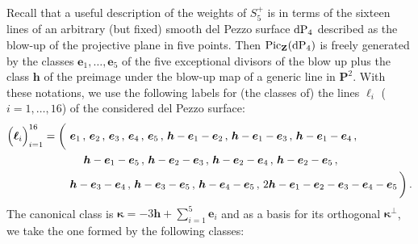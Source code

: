 \documentclass[11pt]{amsart}
\begin{document}
  Recall that a useful description of the weights of $S_5^+$ is in terms of the sixteen lines of an arbitrary (but fixed) smooth del Pezzo surface ${\rm dP}_4$ described as the blow-up of the projective plane in five points.  Then ${\rm Pic}_{\mathbf Z}({\rm dP}_4)$ is freely generated by the classes 
  $\boldsymbol{e}_{1},\ldots,\boldsymbol{e}_{5}$  of the five exceptional divisors of the blow up plus the class $\boldsymbol{h}$ of the preimage under the blow-up map of a generic line in $\mathbf P^2$.  With these notations,  we use the following labels for (the classes  of) the lines $ \boldsymbol{\ell}_i$ ($i=1,\ldots,16$) of the considered del Pezzo surface: 
\begin{align*}%
\Big( \boldsymbol{\ell}_i \Big)_{i=1}^{16}=\bigg(\, & \, \boldsymbol{e}_{1} \, , \, \boldsymbol{e}_{2}\, , \, \boldsymbol{e}_{3}\, , \,\boldsymbol{e}_{4}\, , \, \boldsymbol{e}_{5}\, , \, \boldsymbol{h} -\boldsymbol{e}_{1}-\boldsymbol{e}_{2}\, , \, \boldsymbol{h} -\boldsymbol{e}_{1}-\boldsymbol{e}_{3}\, ,\,  
\boldsymbol{h} -\boldsymbol{e}_{1}-\boldsymbol{e}_{4}\, , 
\\
&  \hspace{0.5cm} \boldsymbol{h} -\boldsymbol{e}_{1}-\boldsymbol{e}_{5}\, , \, \boldsymbol{h} -\boldsymbol{e}_{2}-\boldsymbol{e}_{3}\, , \, \boldsymbol{h} -\boldsymbol{e}_{2}-\boldsymbol{e}_{4}\, , \,  \boldsymbol{h} -\boldsymbol{e}_{2}-\boldsymbol{e}_{5}\, ,
\\
& \, \boldsymbol{h} -\boldsymbol{e}_{3}-\boldsymbol{e}_{4}\, , \, \boldsymbol{h} -\boldsymbol{e}_{3}-\boldsymbol{e}_{5}
\, , \,
 \boldsymbol{h} -\boldsymbol{e}_{4}-\boldsymbol{e}_{5}
 \, , \, 
2 \boldsymbol{h} -\boldsymbol{e}_{1}-\boldsymbol{e}_{2}-\boldsymbol{e}_{3}-\boldsymbol{e}_{4}-\boldsymbol{e}_{5}\, \bigg) \, .
\end{align*}%
The canonical class is 
$
\boldsymbol{\kappa}=-3 \boldsymbol{h}+\sum_{i=1}^5 \boldsymbol{e}_{i}$ and as a basis for its orthogonal $\boldsymbol{\kappa}^\perp$, we take the one formed by the following classes: 
\end{document}
